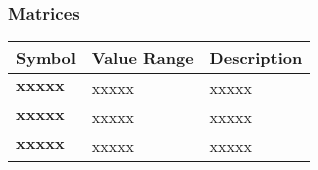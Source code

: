 \subsubsection{Matrices}

\begin{longtable}{>{\raggedright\arraybackslash}p{1cm}>{\raggedright\arraybackslash}p{4cm}>{\raggedright\arraybackslash}p{9cm}}

  \hline

  \textbf{Symbol} & \textbf{Value Range} & \textbf{Description} \\

  \hline

  $\mathbf{xxxxx}$ & xxxxx & xxxxx \\

  $\mathbf{xxxxx}$ & xxxxx & xxxxx \\

  $\mathbf{xxxxx}$ & xxxxx & xxxxx \\

  \hline

\end{longtable}





